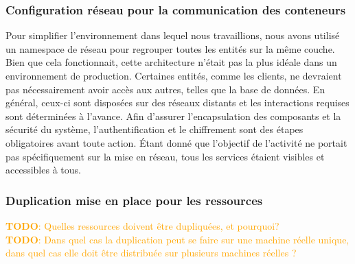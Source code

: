 \documentclass[a11paper, 11pt]{article}
\newcommand{\todo}[1]{\textcolor{orange}{\textbf{TODO}: #1}}
\begin{document}
\subsubsection{Configuration réseau pour la communication des conteneurs}

Pour simplifier l'environnement dans lequel nous travaillions, nous avons utilisé un namespace de réseau pour regrouper toutes les entités sur la même couche. Bien que cela fonctionnait, cette architecture n'était pas la plus idéale dans un environnement de production. Certaines entités, comme les clients, ne devraient pas nécessairement avoir accès aux autres, telles que la base de données. En général, ceux-ci sont disposées sur des réseaux distants et les interactions requises sont déterminées à l'avance. Afin d'assurer l'encapsulation des composants et la sécurité du système, l'authentification et le chiffrement sont des étapes obligatoires avant toute action. Étant donné que l'objectif de l'activité ne portait pas spécifiquement sur la mise en réseau, tous les services étaient visibles et accessibles à tous.

\subsubsection{Duplication mise en place pour les ressources}

\todo{Quelles ressources doivent être dupliquées, et pourquoi?} \\
\todo{Dans quel cas la duplication peut se faire sur une machine réelle unique, dans
quel cas elle doit être distribuée sur plusieurs machines réelles ?}


\end{document}

